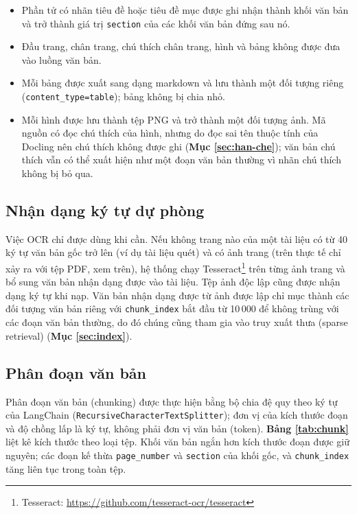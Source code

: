 \begin{itemize}
    \item Phần tử có nhãn tiêu đề hoặc tiêu đề mục được ghi nhận thành khối văn bản và trở thành giá trị \texttt{section} của các khối văn bản đứng sau nó.
    \item Đầu trang, chân trang, chú thích chân trang, hình và bảng không được đưa vào luồng văn bản.
    \item Mỗi bảng được xuất sang dạng markdown và lưu thành một đối tượng riêng (\texttt{content\_type=table}); bảng không bị chia nhỏ.
    \item Mỗi hình được lưu thành tệp PNG và trở thành một đối tượng ảnh. Mã nguồn có đọc chú thích của hình, nhưng do đọc sai tên thuộc tính của Docling nên chú thích không được ghi (\textbf{Mục \ref{sec:han-che}}); văn bản chú thích vẫn có thể xuất hiện như một đoạn văn bản thường vì nhãn chú thích không bị bỏ qua.
\end{itemize}

\subsection{Nhận dạng ký tự dự phòng}

Việc OCR chỉ được dùng khi cần. Nếu không trang nào của một tài liệu có từ 40 ký tự văn bản gốc trở lên (ví dụ tài liệu quét) và có ảnh trang (trên thực tế chỉ xảy ra với tệp PDF, xem trên), hệ thống chạy Tesseract\footnote{Tesseract: \url{https://github.com/tesseract-ocr/tesseract}} \cite{smith2007tesseract} trên từng ảnh trang và bổ sung văn bản nhận dạng được vào tài liệu. Tệp ảnh độc lập cũng được nhận dạng ký tự khi nạp. Văn bản nhận dạng được từ ảnh được lập chỉ mục thành các đối tượng văn bản riêng với \texttt{chunk\_index} bắt đầu từ 10\,000 để không trùng với các đoạn văn bản thường, do đó chúng cũng tham gia vào truy xuất thưa (sparse retrieval) (\textbf{Mục \ref{sec:index}}).

\subsection{Phân đoạn văn bản}

Phân đoạn văn bản (chunking) được thực hiện bằng bộ chia đệ quy theo ký tự của LangChain (\texttt{Recursive\allowbreak Character\allowbreak Text\allowbreak Splitter}); đơn vị của kích thước đoạn và độ chồng lấp là ký tự, không phải đơn vị văn bản (token). \textbf{Bảng \ref{tab:chunk}} liệt kê kích thước theo loại tệp. Khối văn bản ngắn hơn kích thước đoạn được giữ nguyên; các đoạn kế thừa \texttt{page\_number} và \texttt{section} của khối gốc, và \texttt{chunk\_index} tăng liên tục trong toàn tệp.

